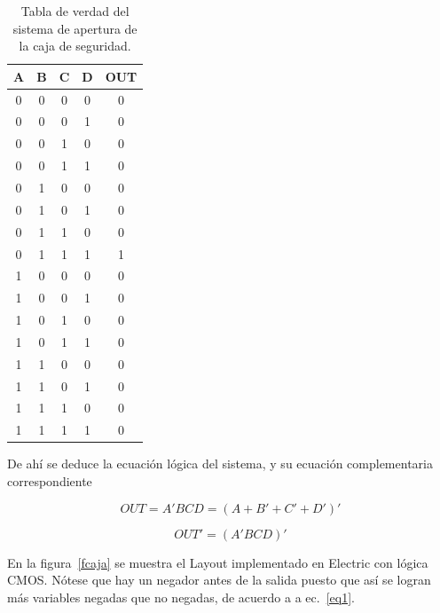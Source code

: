 \documentclass[twocolumn]{IEEEtran}
\begin{document}
\begin{table}[H]
  \caption{Tabla de verdad del sistema de apertura de la caja de seguridad.}
    \centering
      \begin{tabular}{|c|c|c|c|c|}\hline
       \bf A & \bf B & \bf C & \bf D & \bf OUT \\ \hline
       0 & 0 & 0 & 0 & 0 \\ \hline
       0 & 0 & 0 & 1 & 0 \\ \hline
       0 & 0 & 1 & 0 & 0 \\ \hline
       0 & 0 & 1 & 1 & 0 \\ \hline
       0 & 1 & 0 & 0 & 0 \\ \hline
       0 & 1 & 0 & 1 & 0 \\ \hline
       0 & 1 & 1 & 0 & 0 \\ \hline
       0 & 1 & 1 & 1 & 1 \\ \hline
       1 & 0 & 0 & 0 & 0 \\ \hline
       1 & 0 & 0 & 1 & 0 \\ \hline
       1 & 0 & 1 & 0 & 0 \\ \hline
       1 & 0 & 1 & 1 & 0 \\ \hline
       1 & 1 & 0 & 0 & 0 \\ \hline
       1 & 1 & 0 & 1 & 0 \\ \hline
       1 & 1 & 1 & 0 & 0 \\ \hline
       1 & 1 & 1 & 1 & 0 \\ \hline
      \end{tabular}
  \label{tverdad}
\end{table}

De ahí se deduce la ecuación lógica del sistema, y su ecuación complementaria correspondiente

\begin{equation}
OUT = A'BCD = (A+B'+C'+D')'
\label{eq1}
\end{equation}

\begin{equation}
OUT' = (A'BCD)'
\end{equation}

En la figura~\ref{fcaja} se muestra el Layout implementado en Electric con lógica CMOS. Nótese que hay un negador antes de la salida puesto que así se logran más variables negadas que no negadas, de acuerdo a a ec.~\ref{eq1}.
\end{document}
